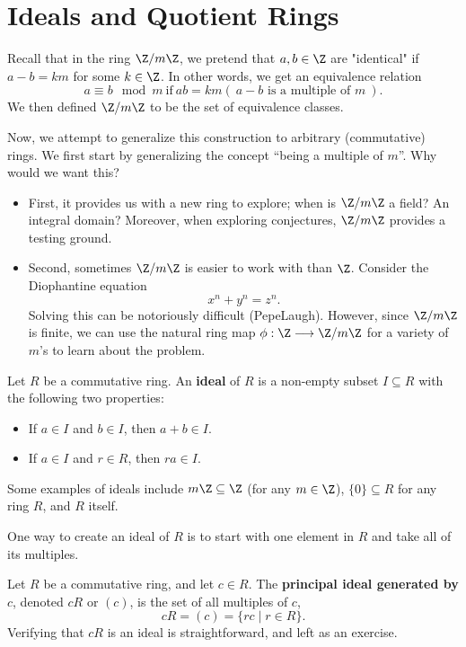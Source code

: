 \documentclass[math1530-lecture-notes]{subfiles}
\begin{document}
\section{Ideals and Quotient Rings}
Recall that in the ring $\Z / m\Z$, we pretend that $a,b\in \Z$ are "identical" if $a-b=km$ for some
$k\in \Z$. In other words, we get an equivalence relation \[
  a\equiv b\mod{m} ~\text{if}~ ab=km (~\text{$a-b$ is a multiple of $m$}~)
.\] We then defined $\Z / m\Z$ to be the set of equivalence classes.

Now, we attempt to generalize this construction to arbitrary (commutative) rings. We first start by
generalizing the concept ``being a multiple of $m$''. Why would we want this? 
\begin{itemize}
  \item First, it provides us with a new ring to explore; when is $\Z / m\Z$ a field? An integral
    domain? Moreover, when exploring conjectures, $\Z /m\Z$ provides a testing ground.
  \item Second, sometimes $\Z / m\Z$ is easier to work with than $\Z$. Consider the Diophantine
    equation \[
      x^{n}+y^{n}=z^{n}
    .\] Solving this can be notoriously difficult (PepeLaugh). However, since $\Z / m\Z$ is finite,
    we can use the natural ring map $\phi:\Z \longrightarrow \Z/m\Z$ for a variety of $m$'s to learn
    about the problem.
\end{itemize}

\begin{definition}[Ideals]{}
  Let $R$ be a commutative ring. An \textbf{ideal} of $R$ is a non-empty subset $I\subseteq R$ with
  the following two properties:
  \begin{itemize}
    \item If $a \in I$ and $b\in I$, then $a+b\in I$.
    \item If $a \in I$ and $r\in R$, then $ra\in I$.
  \end{itemize}
\end{definition}

Some examples of ideals include $m\Z\subseteq \Z$ (for any $m\in \Z$), $\{ 0 \}\subseteq R$ for any
ring $R$, and $R$ itself.

One way to create an ideal of $R$ is to start with one element in $R$ and take all of its multiples.
\begin{definition}{}
  Let $R$ be a commutative ring, and let $c\in R$. The \textbf{principal ideal generated by $c$},
  denoted $cR$ or $(c)$, is the set of all multiples of $c$, \[
    cR = (c) = \{rc\mid r\in R\} 
  .\] Verifying that $cR$ is an ideal is straightforward, and left as an exercise. 
\end{definition}
\end{document}

